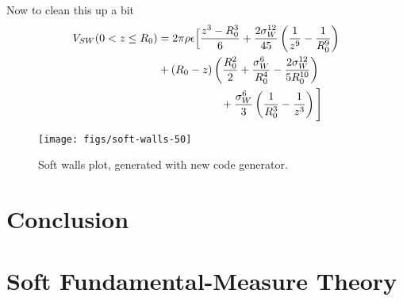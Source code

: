 \documentclass[letterpaper,twocolumn,amsmath,amssymb,prb]{revtex4-1}
\begin{document}
Now to clean this up a bit
\begin{align}
V_{SW}(0 < z \leq R_0) &= 2\pi\rho\epsilon\Big[ \frac{z^3-R_0^3}{6} +
  \frac{2\sigma_W^{12}}{45} \left(\frac{1}{z^9}-\frac{1}{R_0^9}\right)
  \notag \\
  &+ \left( R_0 - z \right)\left(\frac{R_0^2}{2} +
  \frac{\sigma_W^6}{R_0^4} - \frac{2\sigma_W^{12}}{5R_0^{10}}\right)
  \notag \\
  &\hspace{2cm}+\frac{\sigma_W^6}{3}\left(\frac{1}{R_0^3}-\frac{1}{z^3}
  \right) \Bigg]
\end{align}

\begin{figure}
  \texttt{[image: figs/soft-walls-50]}
  \caption{Soft walls plot, generated with new code generator.}
\end{figure}

\section{Conclusion}

\appendix

\section{Soft Fundamental-Measure Theory}
\end{document}
